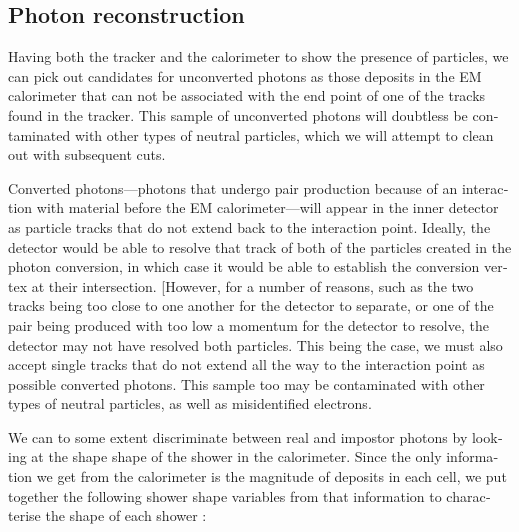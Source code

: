 \begin{english}
\subsection{Photon reconstruction}

Having both the tracker and the calorimeter to show the presence of particles, we can pick out candidates for unconverted photons as those deposits in the EM calorimeter that can not be associated with the end point of one of the tracks found in the tracker. This sample of unconverted photons will doubtless be contaminated with other types of neutral particles, which we will attempt to clean out with subsequent cuts.

Converted photons---photons that undergo pair production because of an interaction with material before the EM calorimeter---will appear in the inner detector as particle tracks that do not extend back to the interaction point. Ideally, the detector would be able to resolve that track of both of the particles created in the photon conversion, in which case it would be able to establish the conversion vertex at their intersection. [However, for a number of reasons, such as the two tracks being too close to one another for the detector to separate, or one of the pair being produced with too low a momentum for the detector to resolve, the detector may not have resolved both particles. This being the case, we must also accept single tracks that do not extend all the way to the interaction point as possible converted photons. This sample too may be contaminated with other types of neutral particles, as well as misidentified electrons.

We can to some extent discriminate between real and impostor photons by looking at the shape shape of the shower in the calorimeter. Since the only information we get from the calorimeter is the magnitude of deposits in each cell, we put together the following shower shape variables from that information to characterise the shape of each shower \cite{Carminati}:


\end{english}
